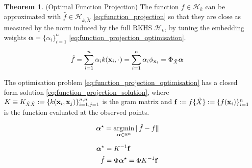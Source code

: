 \documentclass[twoside]{article} \usepackage{aistats2017}
\theoremstyle{definition}
\theoremstyle{theorem}
\newtheorem{theorem}{Theorem}[section]
\newcommand{\argmin}{\operatornamewithlimits{argmin}}
\newcommand{\ds}[1]{\tilde{#1}}
\begin{document}
		\begin{theorem} \label{thm:function_projection_solution}
			(Optimal Function Projection)
			The function $f \in \mathcal{H}_{k}$ can be approximated with $\hat{f} \in \mathcal{H}_{k, \ds{X}}$ \eqref{eq:function_projection} so that they are close as measured by the norm induced by the full RKHS $\mathcal{H}_{k}$, by tuning the embedding weights $\bm{\alpha} = \{\alpha_{i}\}_{i = 1}^{n}$ \eqref{eq:function_projection_optimisation}.
			
			\begin{equation}
				\hat{f} = \sum_{i = 1}^{n} \alpha_{i} k(\bvec{x}_{i}, \cdot) = \sum_{i = 1}^{n} \alpha_{i} \phi_{\bvec{x}_{i}} = \Phi_{\ds{X}} \bm{\alpha}
			\label{eq:function_projection}
			\end{equation}
	
			The optimisation problem \eqref{eq:function_projection_optimisation} has a closed form solution \eqref{eq:function_projection_solution}, where $K \equiv K_{\ds{X} \ds{X}} := \{k(\bvec{x}_{i}, \bvec{x}_{j})\}_{i = 1, j = 1}^{n, n}$ is the gram matrix and $\bvec{f} := f\{\ds{X}\} := \{f(\bvec{x}_{i})\}_{i = 1}^{n}$ is the function evaluated at the observed points.
				
			\begin{equation}
				\bm{\alpha}^{\star} = \argmin_{\bm{\alpha} \in \mathbb{R}^{n}} \Vert \hat{f} - f \Vert
			\label{eq:function_projection_optimisation}
			\end{equation}
			
			\begin{equation}
			\begin{aligned}
				\bm{\alpha}^{\star} &= K^{-1} \mathbf{f} \\
				\hat{f} &= \Phi \bm{\alpha}^{\star} = \Phi K^{-1} \mathbf{f}
			\label{eq:function_projection_solution}
			\end{aligned}
			\end{equation}
				
		\end{theorem}
			
\end{document}
